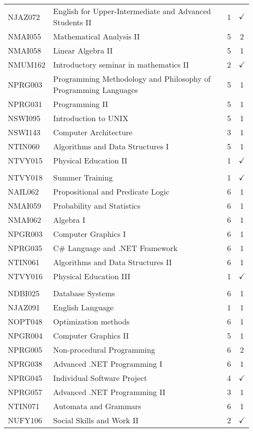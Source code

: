 \documentclass[a4paper,10pt]{article}
\begin{document}
\begin{center}
\begin{supertabular}{l l c c}
NJAZ072 & English for Upper-Intermediate and Advanced Students II & 1 & $\checkmark$\\
NMAI055 & Mathematical Analysis II & 5 & 2\\
NMAI058 & Linear Algebra II & 5 & 1\\
NMUM162 & Introductory seminar in mathematics II & 2 & $\checkmark$\\
NPRG003 & Programming Methodology and Philosophy of Programming Languages & 5 & 1\\
NPRG031 & Programming II & 5 & 1\\
NSWI095 & Introduction to UNIX & 5 & 1\\
NSWI143 & Computer Architecture & 3 & 1\\
NTIN060 & Algorithms and Data Structures I & 5 & 1\\
NTVY015 & Physical Education II & 1 & $\checkmark$\\
 

\hline\\

NTVY018 & Summer Training & 1 & $\checkmark$\\
NAIL062 & Propositional and Predicate Logic & 6 & 1\\
NMAI059 & Probability and Statistics & 6 & 1\\
NMAI062 & Algebra I & 6 & 1\\
NPGR003 & Computer Graphics I & 6 & 1\\
NPRG035 & C\# Language and .NET Framework & 6 & 1\\
NTIN061 & Algorithms and Data Structures II & 6 & 1\\
NTVY016 & Physical Education III & 1 & $\checkmark$\\

\hline\\

NDBI025 & Database Systems & 6 & 1\\
NJAZ091 & English Language & 1 & 1\\
NOPT048 & Optimization methods & 6 & 1\\
NPGR004 & Computer Graphics II & 5 & 1\\
NPRG005 & Non-procedural Programming & 6 & 2\\
NPRG038 & Advanced .NET Programming I & 6 & 1\\
NPRG045 & Individual Software Project & 4 & $\checkmark$\\
NPRG057 & Advanced .NET Programming II & 3 & 1\\
NTIN071 & Automata and Grammars & 6 & 1\\
NUFY106 & Social Skills and Work II & 2 & $\checkmark$\\


\end{supertabular}
\end{center}
\end{document}
